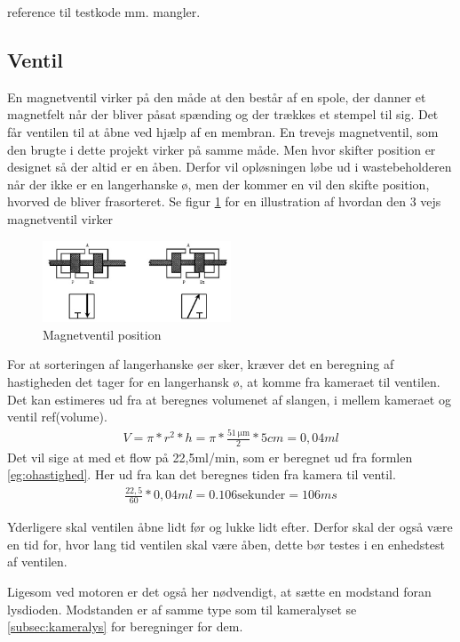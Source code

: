 reference til testkode mm. mangler.


 \subsection{Ventil}
 En magnetventil virker på den måde at den består af en spole, der danner et magnetfelt når der bliver påsat spænding og der trækkes et stempel til sig. Det får ventilen til at åbne ved hjælp af en membran. En trevejs magnetventil, som den brugte i dette projekt virker på samme måde. Men hvor skifter position er designet så der altid er en åben. Derfor vil opløsningen løbe ud i wastebeholderen når der ikke er en langerhanske ø, men der kommer en vil den skifte position, hvorved de bliver frasorteret. Se figur \ref{fig:ventilpos} for en illustration af hvordan den 3 vejs magnetventil virker

\begin{figure}[H]
	\centering
	\includegraphics[width=0.5\textwidth]{billeder/Hardware/ventil.png}
	\caption{Magnetventil position}
	\label{fig:ventilpos}
\end{figure}  
For at sorteringen af langerhanske øer sker, kræver det en beregning af hastigheden det tager for en langerhansk ø, at komme fra kameraet til ventilen. Det kan estimeres ud fra at beregnes volumenet af slangen, i mellem kameraet og ventil ref(volume).
\begin{align}
V=\pi*r^2*h=\pi*\frac{\SI{51}{\micro\metre}}{2}*5cm=0,04ml
\end{align}
 Det vil sige at med et flow på 22,5ml/min, som er beregnet ud fra formlen \ref{eg:ohastighed}. Her ud fra kan det beregnes tiden fra kamera til ventil. 
 \begin{align}
\frac{22,5}{60}*0,04ml=0.106\text{sekunder}=106ms
\end{align}

Yderligere skal ventilen åbne lidt før og lukke lidt efter. Derfor skal der også være en tid for, hvor lang tid ventilen skal være åben, dette bør testes i en enhedstest af ventilen.

Ligesom ved motoren er det også her nødvendigt, at sætte en modstand foran lysdioden. Modstanden er af samme type som til kameralyset se \ref{subsec:kameralys} for beregninger for dem. 

